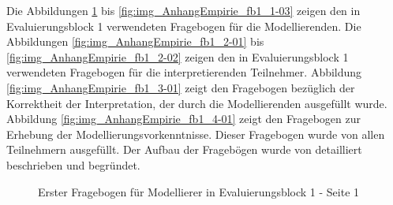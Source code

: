 Die Abbildungen \ref{fig:img_AnhangEmpirie_fb1_1-01} bis \ref{fig:img_AnhangEmpirie_fb1_1-03} zeigen den in Evaluierungsblock 1 verwendeten Fragebogen für die Modellierenden. Die Abbildungen \ref{fig:img_AnhangEmpirie_fb1_2-01} bis \ref{fig:img_AnhangEmpirie_fb1_2-02} zeigen den in Evaluierungsblock 1 verwendeten Fragebogen für die interpretierenden Teilnehmer. Abbildung \ref{fig:img_AnhangEmpirie_fb1_3-01} zeigt den Fragebogen bezüglich der Korrektheit der Interpretation, der durch die Modellierenden ausgefüllt wurde. Abbildung \ref{fig:img_AnhangEmpirie_fb1_4-01} zeigt den Fragebogen zur Erhebung der Modellierungsvorkenntnisse. Dieser Fragebogen wurde von allen Teilnehmern ausgefüllt. Der Aufbau der Fragebögen wurde von \cite{Bohninger10} detailliert beschrieben und begründet.

\begin{figure}[htbp]
	\centering
	\caption{Erster Fragebogen für Modellierer in Evaluierungsblock 1 - Seite 1}
	\label{fig:img_AnhangEmpirie_fb1_1-01}
\end{figure}

